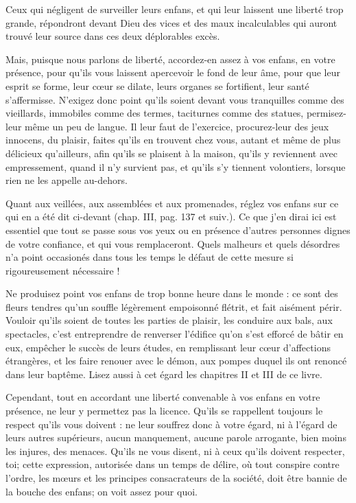\documentclass[instructions.tex]{subfiles}
\begin{document}
Ceux qui négligent de surveiller leurs enfans, et qui leur laissent une liberté trop grande, répondront devant Dieu des vices et des maux incalculables qui auront trouvé leur source dans ces deux déplorables excès.
 
Mais, puisque nous parlons de liberté, accordez-en assez à vos enfans, en votre présence, pour qu’ils vous laissent apercevoir le fond de leur âme, pour que leur esprit se forme, leur cœur se dilate, leurs organes se fortifient, leur santé s’affermisse. N’exigez donc point qu’ils soient devant vous tranquilles comme des vieillards, immobiles comme des termes, taciturnes comme des statues, permisez-leur même un peu de langue. Il leur faut de l’exercice, procurez-leur des jeux innocens, du plaisir, faites qu’ils en trouvent chez vous, autant et même de plus délicieux qu’ailleurs, afin qu’ils se plaisent à la maison, qu’ils y reviennent avec empressement, quand il n’y survient pas, et qu’ils s’y tiennent volontiers, lorsque rien ne les appelle au-dehors.
 
Quant aux veillées, aux assemblées et aux promenades, réglez vos enfans sur ce qui en a été dit ci-devant (chap. III, pag. 137 et suiv.). Ce que j’en dirai ici est essentiel que tout se passe sous vos yeux ou en présence d’autres personnes dignes de votre confiance, et qui vous remplaceront. Quels malheurs et quels désordres n’a point occasionés dans tous les temps le défaut de cette mesure si rigoureusement nécessaire !
 
Ne produisez point vos enfans de trop bonne heure dans le monde : ce sont des fleurs tendres qu’un souffle légèrement empoisonné flétrit, et fait aisément périr. Vouloir qu’ils soient de toutes les parties de plaisir, les conduire aux bals, aux spectacles, c’est entreprendre de renverser l’édifice qu’on s’est efforcé de bâtir en eux, empêcher le succès de leurs études, en remplissant leur cœur d’affections étrangères, et les faire renouer avec le démon, aux pompes duquel ils ont renoncé dans leur baptême. Lisez aussi à cet égard les chapitres II et III de ce livre.
 
Cependant, tout en accordant une liberté convenable à vos enfans en votre présence, ne leur y permettez pas la licence. Qu’ils se rappellent toujours le respect qu’ils vous doivent : ne leur souffrez donc à votre égard, ni à l’égard de leurs autres supérieurs, aucun manquement, aucune parole arrogante, bien moins les injures, des menaces. Qu’ils ne vous disent, ni à ceux qu’ils doivent respecter, toi; cette expression, autorisée dans un temps de délire, où tout conspire contre l’ordre, les mœurs et les principes consacrateurs de la société, doit être bannie de la bouche des enfans; on voit assez pour quoi.
 
\end{document}
